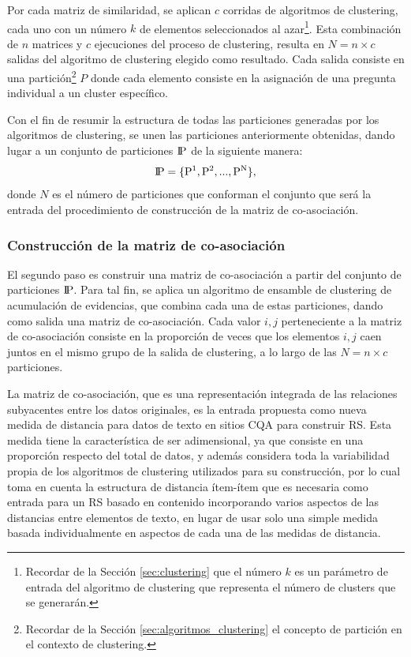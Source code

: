 \bigskip Por cada matriz de similaridad, se aplican \(c\) corridas de algoritmos de clustering, cada uno con un número \(k\) de elementos seleccionados al azar\footnote{Recordar de la Sección \ref{sec:clustering} que el número \(k\) es un parámetro de entrada del algoritmo de clustering que representa el número de clusters que se generarán.}. Esta combinación de \(n\) matrices y \(c\) ejecuciones del proceso de clustering, resulta en \(N = n \times c\) salidas del algoritmo de clustering elegido como resultado. Cada salida consiste en una partición\footnote{Recordar de la Sección \ref{sec:algoritmos_clustering} el concepto de partición en el contexto de clustering.} \(P\) donde cada elemento consiste en la asignación de una pregunta individual a un cluster específico.

\bigskip Con el fin de resumir la estructura de todas las particiones generadas por los algoritmos de clustering, se unen las particiones anteriormente obtenidas, dando lugar a un conjunto de particiones \(\rm I\!P\) de la siguiente manera:
\[\rm I\!P = \{P^1, P^2, ..., P^N\},\]
donde \(N\) es el número de particiones que conforman el conjunto que será la entrada del procedimiento de construcción de la matriz de co-asociación.

\subsubsection{Construcción de la matriz de co-asociación}
El segundo paso es construir una matriz de co-asociación a partir del conjunto de particiones \(\rm I\!P\). Para tal fin, se aplica un algoritmo de ensamble de clustering de acumulación de evidencias, que combina cada una de estas particiones, dando como salida una matriz de co-asociación. Cada valor \(i,j\) perteneciente a la matriz de co-asociación consiste en la proporción de veces que los elementos \(i,j\) caen juntos en el mismo grupo de la salida de clustering, a lo largo de las \(N=n \times c\) particiones.

\bigskip La matriz de co-asociación, que es una representación integrada de las relaciones subyacentes entre los datos originales, es la entrada propuesta como nueva medida de distancia para datos de texto en sitios CQA para construir RS. Esta medida tiene la característica de ser adimensional, ya que consiste en una proporción respecto del total de datos, y además considera toda la variabilidad propia de los algoritmos de clustering utilizados para su construcción, por lo cual toma en cuenta la estructura de distancia ítem-ítem que es necesaria como entrada para un RS basado en contenido incorporando varios aspectos de las distancias entre elementos de texto, en lugar de usar solo una simple medida basada individualmente en aspectos de cada una de las medidas de distancia.

